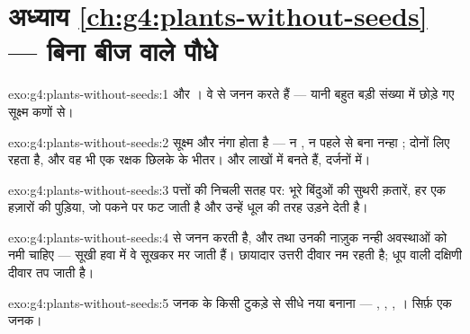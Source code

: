 \section*{अध्याय \ref{ch:g4:plants-without-seeds} --- बिना बीज वाले पौधे}

\begin{solution}{exo:g4:plants-without-seeds:1}
 और । वे  से जनन करते हैं --- यानी बहुत बड़ी संख्या में
छोड़े गए सूक्ष्म कणों से।
\end{solution}

\begin{solution}{exo:g4:plants-without-seeds:2}
 सूक्ष्म और नंगा होता है --- न , न पहले से बना नन्हा
;  दोनों लिए रहता है, और वह भी एक रक्षक छिलके के भीतर। और
 लाखों में बनते हैं,  दर्जनों में।
\end{solution}

\begin{solution}{exo:g4:plants-without-seeds:3}
पत्तों की निचली सतह पर: भूरे बिंदुओं की सुथरी क़तारें, हर एक हज़ारों
 की पुड़िया, जो पकने पर फट जाती है और उन्हें धूल की तरह उड़ने
देती है।
\end{solution}

\begin{solution}{exo:g4:plants-without-seeds:4}
  से जनन करती है, और  तथा उनकी नाज़ुक नन्ही अवस्थाओं
को नमी चाहिए --- सूखी हवा में वे सूखकर मर जाती हैं। छायादार उत्तरी
दीवार नम रहती है; धूप वाली दक्षिणी दीवार तप जाती है।
\end{solution}

\begin{solution}{exo:g4:plants-without-seeds:5}
जनक  के किसी टुकड़े से सीधे नया  बनाना --- , ,
, । सिर्फ़ एक जनक।
\end{solution}

